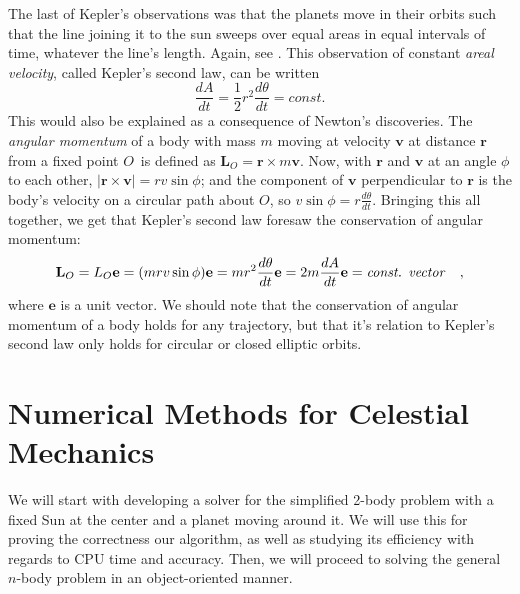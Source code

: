 \documentclass[]{article}
\begin{document}
The last of Kepler's observations was that the planets move in their orbits such that the line joining it to the sun sweeps over equal areas in equal intervals of time, whatever the line's length. Again, see \cite{hibbeler2001}. This observation of constant \textit{areal velocity}, called Kepler's second law, can be written
\begin{equation}
	\frac{dA}{dt} = \frac{1}{2} r^2 \frac{d\theta}{dt} = const.
\end{equation}
This would also be explained as a consequence of Newton's discoveries. The \textit{angular momentum} of a body with mass $m$ moving at velocity $\mathbf{v}$ at distance $\mathbf{r}$ from a fixed point $O$ is defined as $\mathbf{L}_O = \mathbf{r} \times m\mathbf{v}$. Now, with $\mathbf{r}$ and $\mathbf{v}$ at an angle $\phi$ to each other, $|\mathbf{r} \times \mathbf{v}| = rv \sin \phi$; and the component of $\mathbf{v}$ perpendicular to $\mathbf{r}$ is the body's velocity on a circular path about $O$, so $v \sin \phi = r \frac{d\theta}{dt}$. Bringing this all together, we get that Kepler's second law foresaw the conservation of angular momentum:
\begin{equation}
	\mathbf{L}_O = L_O\mathbf{e} = (mrv \sin \phi )\mathbf{e} = mr^2 \frac{d\theta}{dt} \mathbf{e} = 2m \frac{dA}{dt} \mathbf{e} = \text{\textit{const. vector}} \quad,
\end{equation}
where $\mathbf{e}$ is a unit vector. We should note that the conservation of angular momentum of a body holds for any trajectory, but that it's relation to Kepler's second law only holds for circular or closed elliptic orbits.

\section{Numerical Methods for Celestial Mechanics} \label{methods}

We will start with developing a solver for the simplified 2-body problem with a fixed Sun at the center and a planet moving around it. We will use this for proving the correctness our algorithm, as well as studying its efficiency with regards to CPU time and accuracy. Then, we will proceed to solving the general $n$-body problem in an object-oriented manner. 
\end{document}
